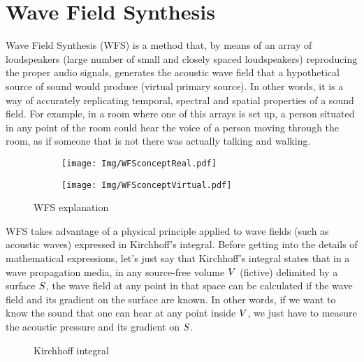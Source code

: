 \section{Wave Field Synthesis}
Wave Field Synthesis (WFS) is a method that, by means of an array of loudspeakers (large number of small and closely spaced loudspeakers) reproducing the proper audio signals, generates the acoustic wave field that a hypothetical source of sound would produce (virtual primary source). In other words, it is a way of accurately replicating temporal, spectral and spatial properties of a sound field. For example, in a room where one of this arrays is set up, a person situated in any point of the room could hear the voice of a person moving through the room, as if someone that is not there was actually talking and walking.

\begin{figure}[h]
	\centering
	\begin{subfigure}[c]{0.45\textwidth}
		\centering
		\texttt{[image: Img/WFSconceptReal.pdf]}
	\end{subfigure}
	\begin{subfigure}[c]{0.45\textwidth}
		\centering
		\texttt{[image: Img/WFSconceptVirtual.pdf]}
	\end{subfigure}
\caption[WFS explanation]{WFS explanation \cite{icons1}}
\label{WFSimageExplanation}
\end{figure}

WFS takes advantage of a physical principle applied to wave fields (such as acoustic waves) expressed in Kirchhoff's integral. Before getting into the details of mathematical expressions, let's just say that Kirchhoff's integral states that in a wave propagation media, in any source-free volume $V$ (fictive) delimited by a surface $S$, the wave field at any point in that space can be calculated if the wave field and its gradient on the surface are known. In other words, if we want to know the sound that one can hear at any point inside $V$, we just have to measure the acoustic pressure and its gradient on $S$.

\begin{figure}[h]
		\centering
		\def\svgwidth{0.5\columnwidth}
		\graphicspath{{../TFM/Img/}}
		
	\caption[Kirchhoff integral]{Kirchhoff integral \cite{Brandenburg2009}}
	\label{KirchhoffScheme}
\end{figure}

